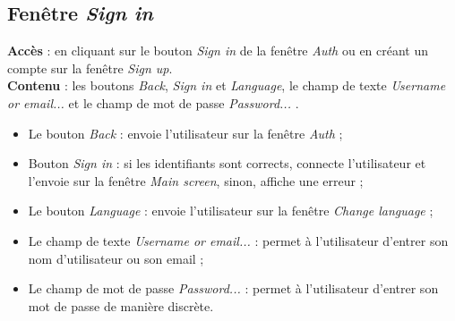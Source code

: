 \documentclass{article}
\newcommand{\navbutton}[2]{Le bouton \emph{#1} : envoie l'utilisateur sur la fenêtre \emph{#2}}
\newcommand{\textfield}[2]{Le champ de texte \emph{#1} : permet à l'utilisateur d'entrer #2}
\newcommand{\passwordfield}[2]{Le champ de mot de passe \emph{#1} : permet à l'utilisateur d'entrer #2 de manière discrète}
\newcommand{\access}[1]{ \noindent\textbf{Accès} : #1 \\}
\newcommand{\content}[1]{\textbf{Contenu} : #1}
\begin{document}
\subsection{Fenêtre \emph{Sign in}}
\access{en cliquant sur le bouton \emph{Sign in} de la fenêtre \emph{Auth} ou en créant un compte sur la fenêtre \emph{Sign up}.}
\content{les boutons \emph{Back}, \emph{Sign in} et \emph{Language}, le champ de texte \emph{Username or email...} et le champ de mot de passe \emph{Password...} .}
\begin{itemize}
\item \navbutton{Back}{Auth} ;
\item Bouton \emph{Sign in} : si les identifiants sont corrects, connecte l'utilisateur et l'envoie sur la fenêtre \emph{Main screen}, sinon, affiche une erreur ;
\item \navbutton{Language}{Change language} ;
\item \textfield{Username or email...}{son nom d'utilisateur ou son email} ;
\item \passwordfield{Password...}{son mot de passe}.
\end{itemize}
\end{document}
